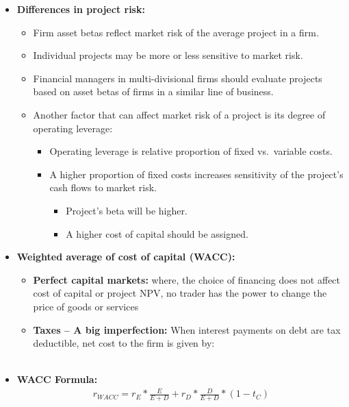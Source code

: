 \documentclass[ieeetran]{article}
\begin{document}
\begin{itemize}
  \item \textbf{Differences in project risk:}
	\begin{itemize}
	  \item Firm asset betas reflect market risk of the average project in a firm.
	\item Individual projects may be more or less sensitive to market risk.
	\item Financial managers in multi-divisional firms should evaluate projects based on asset betas of firms in a similar line of business.
	\item Another factor that can affect market risk of a project is its degree of operating leverage:
		\begin{itemize}
		  \item Operating leverage is relative proportion of fixed vs.\ variable costs.
		\item A higher proportion of fixed costs increases sensitivity of the project's cash flows to market risk.
			\begin{itemize}
			\item Project's beta will be higher.
			\item A higher cost of capital should be assigned.
			\end{itemize}
		\end{itemize}
	\end{itemize}

\item \textbf{Weighted average of cost of capital (WACC):}
        \begin{itemize}
          \item \textbf{Perfect capital markets:} where, the choice of financing does not affect cost of capital or project NPV, no trader has the power to change the price of goods or services
	\item \textbf{Taxes -- A big imperfection:} When interest payments on debt are tax deductible, net cost to the firm is given by: \\ \\
        \end{itemize}
\item \textbf{WACC Formula:}
	\large
	\begin{equation*}
	\boxed{
	\begin{aligned}
		r_{WACC} = r_E * \frac{E}{E + D} + r_D * \frac{D}{E + D} * (1 - t_C)
	\end{aligned}
	}
	\end{equation*}
	\normalsize


\end{itemize}
\end{document}
